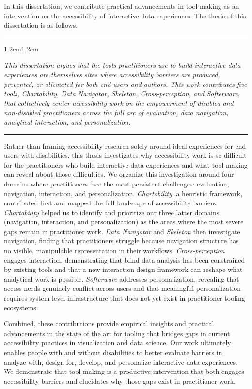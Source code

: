 \documentclass[12pt]{cmuthesis}
\newcommand{\thesisstatement}[1]{%
  \par\addvspace{1\baselineskip}%
  {\centering\noindent\rule{0.5\linewidth}{0.4pt}\par}%
  \addvspace{0.7\baselineskip}%
  \begin{adjustwidth}{1.2em}{1.2em}%
  {\itshape #1\par}%
  \end{adjustwidth}%
  \addvspace{0.7\baselineskip}%
  {\centering\noindent\rule{0.5\linewidth}{0.4pt}\par}%
  \addvspace{1\baselineskip}%
}
\begin{document}
In this dissertation, we contribute practical advancements in tool-making as an intervention on the accessibility of interactive data experiences. The thesis of this dissertation is as follows:

\thesisstatement{This dissertation argues that the tools practitioners use to build interactive data experiences are themselves sites where accessibility barriers are produced, prevented, or alleviated for both end users and authors. This work contributes five tools, Chartability, Data Navigator, Skeleton, Cross-perception, and Softerware, that collectively center accessibility work on the empowerment of disabled and non-disabled practitioners across the full arc of evaluation, data navigation, analytical interaction, and personalization.}

Rather than framing accessibility research solely around ideal experiences for end users with disabilities, this thesis investigates why accessibility work is so difficult for the practitioners who build interactive data experiences and what tool-making can reveal about those difficulties. We organize this investigation around four domains where practitioners face the most persistent challenges: evaluation, navigation, interaction, and personalization. \textit{Chartability}, a heuristic framework, contributed first and mapped the full landscape of accessibility barriers. \textit{Chartability} helped us to identify and prioritize our three latter domains (navigation, interaction, and personalization) as the areas where the most severe gaps remain in practitioner work. \textit{Data Navigator} and \textit{Skeleton} then investigate navigation, finding that practitioners struggle because navigation structure has no visible, manipulable representation in their workflows. \textit{Cross-perception} engages interaction, demonstrating that blind data analysis has been constrained by existing tools and that a new interaction design framework can reshape what analytical work is possible. \textit{Softerware} addresses personalization, revealing that access needs genuinely conflict across users and that meaningful personalization requires system-level infrastructure that does not yet exist in practitioner tooling ecosystems.

Combined, these contributions provide empirical insights and practical advancements in the state of the art for tooling that bridges gaps in current accessibility practices in visualization and data science. Our work ultimately enables people with and without disabilities to better evaluate barriers in, analyze with, design for, develop, and personalize interactive data experiences. We demonstrate that tool-making is a productive intervention that both engages accessibility barriers and elucidates why those gaps exist in practitioner work.
\end{document}
